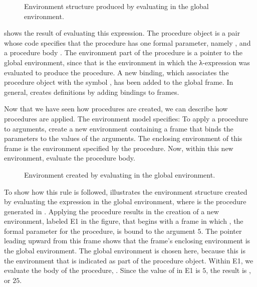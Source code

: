 \begin{figure}[tb]
	\centering
	
	\caption{
		Environment structure produced by evaluating  in the global environment.
	}
	\label{Figure 3.2}
\end{figure}

 shows the result of evaluating this  expression.
The procedure object is a pair whose code specifies that the procedure has one formal parameter, namely , and a procedure body .
The environment part of the procedure is a pointer to the global environment, since that is the environment in which the λ-expression was evaluated to produce the procedure.
A new binding, which associates the procedure object with the symbol , has been added to the global frame.
In general,  creates definitions by adding bindings to frames.

Now that we have seen how procedures are created, we can describe how procedures are applied.
The environment model specifies:
To apply a procedure to arguments, create a new environment containing a frame that binds the parameters to the values of the arguments.
The enclosing environment of this frame is the environment specified by the procedure.
Now, within this new environment, evaluate the procedure body.

\begin{figure}[tb]
	\centering
	
	\caption{
		Environment created by evaluating  in the global environment.
	}
	\label{Figure 3.3}
\end{figure}

To show how this rule is followed,  illustrates the environment structure created by evaluating the expression  in the global environment, where  is the procedure generated in .
Applying the procedure results in the creation of a new environment, labeled E1 in the figure, that begins with a frame in which , the formal parameter for the procedure, is bound to the argument \( 5 \).
The pointer leading upward from this frame shows that the frame’s enclosing environment is the global environment.
The global environment is chosen here, because this is the environment that is indicated as part of the  procedure object.
Within E1, we evaluate the body of the procedure, .
Since the value of  in E1 is \( 5 \), the result is , or \( 25 \).


